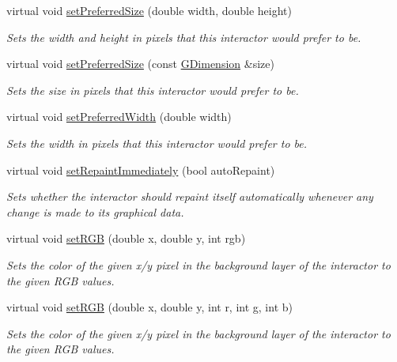 \begin{DoxyCompactItemize}
virtual void \mbox{\hyperlink{classsgl_1_1GInteractor_a042c5ae19430d765ef552371cae3632c}{set\+Preferred\+Size}} (double width, double height)
\begin{DoxyCompactList}\small\item\em Sets the width and height in pixels that this interactor would prefer to be. \end{DoxyCompactList}\item 
virtual void \mbox{\hyperlink{classsgl_1_1GInteractor_aa22d9be4bc0e078bb0ea69b0fc9d7c75}{set\+Preferred\+Size}} (const \mbox{\hyperlink{structsgl_1_1GDimension}{G\+Dimension}} \&size)
\begin{DoxyCompactList}\small\item\em Sets the size in pixels that this interactor would prefer to be. \end{DoxyCompactList}\item 
virtual void \mbox{\hyperlink{classsgl_1_1GInteractor_a3db429ab2fa52efd187eec0ed8cdd9f2}{set\+Preferred\+Width}} (double width)
\begin{DoxyCompactList}\small\item\em Sets the width in pixels that this interactor would prefer to be. \end{DoxyCompactList}\item 
virtual void \mbox{\hyperlink{classsgl_1_1GDrawingSurface_abf5590a3992dcb7896ed449e65961da3}{set\+Repaint\+Immediately}} (bool auto\+Repaint)
\begin{DoxyCompactList}\small\item\em Sets whether the interactor should repaint itself automatically whenever any change is made to its graphical data. \end{DoxyCompactList}\item 
virtual void \mbox{\hyperlink{classsgl_1_1GDrawingSurface_a8bcbd65fa784bdab1e66a9efd381162d}{set\+R\+GB}} (double x, double y, int rgb)
\begin{DoxyCompactList}\small\item\em Sets the color of the given x/y pixel in the background layer of the interactor to the given R\+GB values. \end{DoxyCompactList}\item 
virtual void \mbox{\hyperlink{classsgl_1_1GDrawingSurface_a81202471d4fc9f2015aef0bc073acfab}{set\+R\+GB}} (double x, double y, int r, int g, int b)
\begin{DoxyCompactList}\small\item\em Sets the color of the given x/y pixel in the background layer of the interactor to the given R\+GB values. \end{DoxyCompactList}\item 

\end{DoxyCompactItemize}
